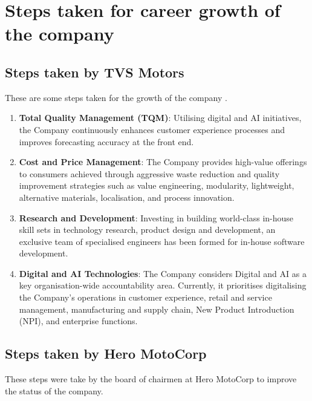 \section{Steps taken for career growth of the company}
\subsection{Steps taken by TVS Motors}

These are some steps taken for the growth of the company \cite{TVS_ANNUAL_REPORT}.

\begin{enumerate}
	\item \textbf{Total Quality Management (TQM)}: Utilising digital and AI initiatives, the Company continuously enhances customer experience processes and improves forecasting accuracy at the front end.
	
	\item \textbf{Cost and Price Management}: The Company provides high-value offerings to consumers achieved through aggressive waste reduction and quality improvement strategies such as value engineering, modularity, lightweight, alternative materials, localisation, and process innovation.
	
	\item \textbf{Research and Development}: Investing in building world-class in-house skill sets	in technology research, product design and development, an exclusive team of specialised engineers has been formed for in-house software development.
	\item \textbf{Digital and AI Technologies}: The Company considers Digital and AI as a key organisation-wide accountability area. Currently, it prioritises digitalising the Company’s operations in customer experience, retail and service management, manufacturing and supply chain, New Product Introduction (NPI), and enterprise functions.
	
\end{enumerate}


\subsection{Steps taken by Hero MotoCorp}

These steps were take by the board of chairmen at Hero MotoCorp to improve the status of the company.

